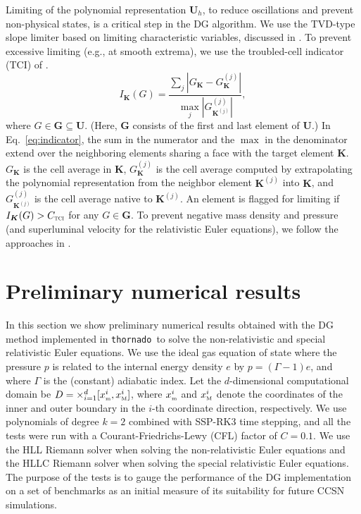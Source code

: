 \documentclass[letterpaper]{jpconf}
\newcommand{\vect}[1]{\boldsymbol{#1}}
\newcommand{\f}[2]{\frac{#1}{#2}}
\newcommand{\bK}{\vect{K}}
\newcommand{\xMin}{x_{\textnormal{\tiny m}}}
\newcommand{\xMax}{x_{\textnormal{\tiny M}}}
\newcommand{\TCI}{\textnormal{\tiny\textsc{TCI}}}
\newcommand{\thornado}{\texttt{thornado}}
\begin{document}
Limiting of the polynomial representation $\vect{U}_{h}$, to reduce oscillations and prevent non-physical states, is a critical step in the DG algorithm.  
We use the TVD-type slope limiter based on limiting characteristic variables, discussed in \cite{cockburnShu_1998}.  
To prevent excessive limiting (e.g., at smooth extrema), we use the troubled-cell indicator (TCI) of \cite{fuShu_2017}.  
\begin{equation}
  I_{\bK}(G) = \f{\sum_{j}|G_{\bK}-G_{\bK}^{(j)}|}{\max_{j}|G_{\bK^{(j)}}^{(j)}|},
  \label{eq:indicator}
\end{equation}
where $G\in\vect{G}\subseteq\vect{U}$.  
(Here, $\vect{G}$ consists of the first and last element of $\vect{U}$.)  
In Eq.~\eqref{eq:indicator}, the sum in the numerator and the $\max$ in the denominator extend over the neighboring elements sharing a face with the target element $\bK$.  
$G_{\bK}$ is the cell average in $\bK$, $G_{\bK}^{(j)}$ is the cell average computed by extrapolating the polynomial representation from the neighbor element $\bK^{(j)}$ into $\bK$, and $G_{\bK^{(j)}}^{(j)}$ is the cell average native to $\bK^{(j)}$.  
An element is flagged for limiting if $I_{\bK}(G)>C_{\TCI}$ for any $G\in\vect{G}$.  
To prevent negative mass density and pressure (and superluminal velocity for the relativistic Euler equations), we follow the approaches in \cite{zhangShu_2010,wuTang_2015,qin_etal_2016}.  

\section{Preliminary numerical results}
\label{sec:numerical}

In this section we show preliminary numerical results obtained with the DG method implemented in \thornado\ to solve the non-relativistic and special relativistic Euler equations.  
We use the ideal gas equation of state where the pressure $p$ is related to the internal energy density $e$ by $p=(\Gamma-1)e$, and where $\Gamma$ is the (constant) adiabatic index.  
Let the $d$-dimensional computational domain be $D=\times_{i=1}^{d}[\xMin^{i},\xMax^{i}]$, where $\xMin^{i}$ and $\xMax^{i}$ denote the coordinates of the inner and outer boundary in the $i$-th coordinate direction, respectively.  
We use polynomials of degree $k=2$ combined with SSP-RK3 time stepping, and all the tests were run with a Courant-Friedrichs-Lewy (CFL) factor of $C=0.1$.  
We use the HLL Riemann solver when solving the non-relativistic Euler equations and the HLLC Riemann solver when solving the special relativistic Euler equations.  
The purpose of the tests is to gauge the performance of the DG implementation on a set of benchmarks as an initial measure of its suitability for future CCSN simulations.  
\end{document}
